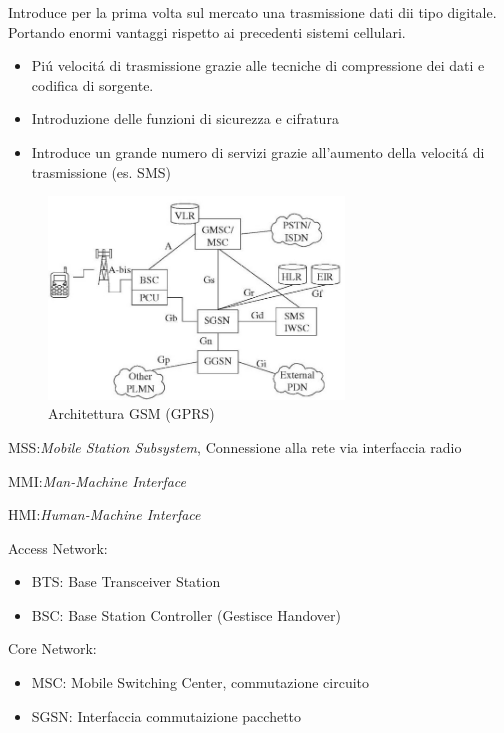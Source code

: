 \documentclass{article}
\begin{document}
Introduce per la prima volta sul mercato una trasmissione dati dii tipo digitale. Portando enormi vantaggi rispetto ai precedenti sistemi cellulari.
\begin{itemize}
    \item Pi\'u velocit\'a di trasmissione  grazie alle tecniche di compressione dei dati e codifica di sorgente.
    \item Introduzione delle funzioni di sicurezza e cifratura
    \item Introduce un grande numero di servizi grazie all'aumento della velocit\'a di trasmissione (es. SMS)
\end{itemize}


\begin{figure}[h]
\includegraphics[width=0.7\textwidth]{img/sdt/gprs}
\centering
\caption{Architettura GSM (GPRS)}
\end{figure}

\bigbreak
MSS:\@\textit{Mobile Station Subsystem}, Connessione alla rete via interfaccia radio

MMI:\@\textit{Man-Machine Interface}

HMI:\@\textit{Human-Machine Interface}

Access Network:
\begin{itemize}
    \item BTS: Base Transceiver Station
    \item BSC: Base Station Controller (Gestisce Handover)
\end{itemize}

Core Network:
\begin{itemize}
    \item MSC: Mobile Switching Center, commutazione circuito
    \item SGSN: Interfaccia commutaizione pacchetto
\end{itemize}
\end{document}
